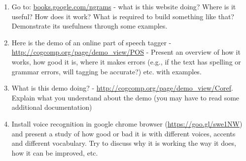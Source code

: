 \documentclass[11pt,a4paper]{article}
\begin{document}
\begin{enumerate}
\begin{enumerate}
\item Go to: \url{books.google.com/ngrams} - what is this website doing? Where is it useful? How does it work? What is required to build something like that? Demonstrate its usefulness through some examples.

\item Here is the demo of an online part of speech tagger - \url{http://cogcomp.org/page/demo\_view/POS} - Present an overview of how it works, how good it is, where it makes errors (e.g., if the text has spelling or grammar errors, will tagging be accurate?) etc. with examples. 

\item What is this demo doing? - \url{http://cogcomp.org/page/demo\_view/Coref}. Explain what you understand about the demo (you may have to read some additional documentation)

\item Install voice recognition in google chrome browser (\url{https://goo.gl/swe1NW}) and present a study of how good or bad it is with different voices, accents and different vocabulary. Try to discuss why it is working the way it does, how it can be improved, etc. 
\end{enumerate}
\end{enumerate}
\end{document}
